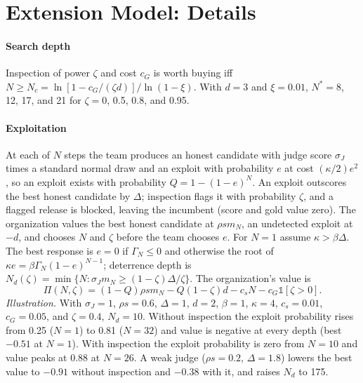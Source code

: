 \documentclass[acmsmall,screen,review]{acmart}
\theoremstyle{acmdefinition}
\begin{document}
\section{Extension Model: Details}\label{app:ext}

\paragraph{Search depth} Inspection of power $\zeta$ and cost $c_G$ is worth buying iff $N \ge N_c = \ln[1 - c_G/(\zeta d)]/\ln(1-\xi)$. With $d = 3$ and $\xi = 0.01$, $N^* = 8$, 12, 17, and 21 for $\zeta = 0$, 0.5, 0.8, and 0.95.

\paragraph{Exploitation} At each of $N$ steps the team produces an honest candidate with judge score $\sigma_J$ times a standard normal draw and an exploit with probability $e$ at cost $(\kappa/2)e^2$, so an exploit exists with probability $Q = 1 - (1-e)^N$. An exploit outscores the best honest candidate by $\Delta$; inspection flags it with probability $\zeta$, and a flagged release is blocked, leaving the incumbent (score and gold value zero). The organization values the best honest candidate at $\rho s m_N$, an undetected exploit at $-d$, and chooses $N$ and $\zeta$ before the team chooses $e$. For $N = 1$ assume $\kappa > \beta\Delta$. The best response is $e = 0$ if $\Gamma_N \le 0$ and otherwise the root of $\kappa e = \beta\Gamma_N(1-e)^{N-1}$; deterrence depth is $N_d(\zeta) = \min\{N : \sigma_J m_N \ge (1-\zeta)\Delta/\zeta\}$. The organization's value is
\begin{equation*}
\Pi(N,\zeta) = (1-Q)\rho s m_N - Q(1-\zeta)d - c_s N - c_G\mathbb{1}[\zeta > 0].
\end{equation*}
\emph{Illustration.} With $\sigma_J = 1$, $\rho s = 0.6$, $\Delta = 1$, $d = 2$, $\beta = 1$, $\kappa = 4$, $c_s = 0.01$, $c_G = 0.05$, and $\zeta = 0.4$, $N_d = 10$. Without inspection the exploit probability rises from 0.25 ($N = 1$) to 0.81 ($N = 32$) and value is negative at every depth (best $-0.51$ at $N = 1$). With inspection the exploit probability is zero from $N = 10$ and value peaks at 0.88 at $N = 26$. A weak judge ($\rho s = 0.2$, $\Delta = 1.8$) lowers the best value to $-0.91$ without inspection and $-0.38$ with it, and raises $N_d$ to 175.
\end{document}

